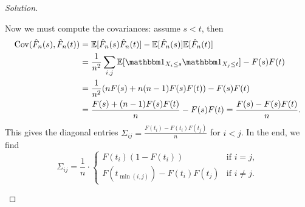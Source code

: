 \documentclass{article}
\theoremstyle{plain}
\theoremstyle{remark}
\newenvironment{solution}{\begin{proof}[Solution]\renewcommand\qedsymbol{}}{\end{proof}}
\newcommand{\Bb}{\mathbb}
\newcommand{\EE}{\Bb E}
\newcommand\ind{\mathbbm 1} %
\DeclareMathOperator\Cov{Cov}
\begin{document}
\begin{solution}
\begin{enumerate}[(a)]
Now we must compute the covariances: assume $s < t$, then  
\begin{align*}
	\Cov(\hat F_n(s), \hat F_n(t)) &= \EE[\hat F_n(s) \hat F_n(t)] - \EE[\hat F_n(s)] \EE[\hat F_n(t)] \\
	&= \frac1{n^2} \sum_{i, j} \EE[\ind_{X_i \leq s} \ind_{X_j \leq t}] - F(s)F(t) \\
	&= \frac1{n^2} \qty(n F(s) + n(n-1) F(s)F(t)) - F(s)F(t) \\
	&= \frac{F(s) + (n-1) F(s) F(t)}{n} - F(s)F(t) = \frac{F(s) - F(s)F(t)}{n}. 
\end{align*}
This gives the diagonal entries $\Sigma_{ij} = \frac{F(t_i) - F(t_i)F(t_j)}{n}$ for $i < j$. 
In the end, we find
\[
\Sigma_{ij} = \frac1n \cdot \begin{cases}
	F(t_i)(1 - F(t_i)) &\text{if $i = j$}, \\
	F(t_{\min(i, j)}) - F(t_i) F(t_j) &\text{if $i \neq j$}. 
\end{cases}
\]
\end{enumerate} 
\end{solution}
\end{document}

